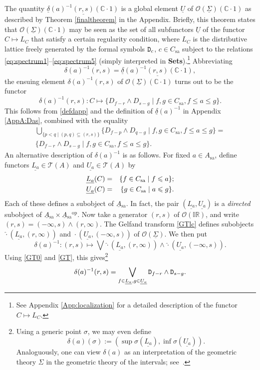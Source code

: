 \documentclass[12pt]{article}
\newcommand{\IR}{\mathbb{IR}}
\newcommand{\beq}{\begin{equation}}
\newcommand{\eeq}{\end{equation}}
\newcommand{\Sets}{\mbox{\textbf{Sets}}}
\newcommand{\inv}{^{-1}}
\newcommand{\er}{\eqref}
\newcommand{\dl}{\delta} \newcommand{\Dl}{\Delta}
\newcommand{\CO}{{\mathcal O}} \newcommand{\CP}{{\mathcal P}}
\newcommand{\C}{{\mathbb C}} \newcommand{\D}{{\mathbb D}}
\newcommand{\alg}[1]{\ensuremath{#1}}
\newcommand{\functor}[1]{\ensuremath{\underline{#1}}}
\newcommand{\op}{\ensuremath{^{\mathrm{op}}}}
\newcommand{\asstopos}{\ensuremath{\mathcal{T}}}
\newcommand{\sa}{\ensuremath{_{\mathrm{sa}}}}
\newcommand{\prop}[1]{\ensuremath{\mbox{\texttt{#1}}}}
\newcommand{\uA}{\underline{A}}
\newcommand{\TA}{\mathcal{T}(A)}
\newcommand{\ulS}{\functor{\Sigma}}
\renewcommand{\TA}{\asstopos(\alg{A})}
\begin{document}
The quantity $\underline{\dl}(a)\inv \underline{(r,s)}(\C\cdot 1)$
 is a global element $\underline{U}$ of $\CO(\ulS)(\C\cdot 1)$ as described by Theorem \ref{finaltheorem}
 in the Appendix. Briefly, this theorem states that $\CO(\ulS)(\C\cdot 1)$ may be seen as the set of all subfunctors $\underline{U}$ of the functor $C\mapsto L_C$ that satisfy a certain regularity condition,
 where $L_C$ is the  distributive lattice  freely generated by the formal symbols $\prop{D}_c$, $c\in C\sa$ subject to the relations \er{eq:spectrum1}--\er{eq:spectrum5} (simply interpreted in \Sets).\footnote{See Appendix \ref{App:localization}
 for a detailed description of the functor $C\mapsto L_C$.}
 Abbreviating
\beq
\dl(a)\inv(r,s)=\underline{\dl}(a)\inv \underline{(r,s)}(\C\cdot 1),
\eeq
 the ensuing element $\dl(a)\inv(r,s)$ of $\CO(\ulS)(\C\cdot 1)$ turns out to be the functor
\beq
\dl(a)\inv(r,s): C \mapsto \{{D}_{f-r} \wedge
 {D}_{s-g}\mid f,g\in C\sa, f \leqslant a \leqslant g\}.
\label{Da}
\eeq
This follows from \er{defdapp} and the definition of $\underline{\dl}(a)\inv$
 in Appendix \ref{AppA:Das}, combined with the equality
\begin{multline*}
   \bigcup_{\{p<q\mid (p,q)\subseteq (r,s)\}}  \{{D}_{f-p} \wedge
 {D}_{q-g}\mid f,g\in C\sa, f \leqslant a \leqslant g\}= \\ 
 \{{D}_{f-r} \wedge
 {D}_{s-g}\mid f,g\in C\sa, f \leqslant a \leqslant g\}.
\end{multline*}
An alternative description of $\dl(a)\inv$ is as follows.
For fixed $a\in A\sa$, define functors $\underline{L_a}\in\TA$ and
$\underline{U_a}\in\TA$ by
 \begin{eqnarray}
\underline{L_a}(C)&=& \{f\in C\sa\mid f\leqslant a\}; \nn\\
\underline{U_a}(C)&=& \{g\in C\sa\mid a\leqslant g\}.
\end{eqnarray}
Each of these defines a subobject of $\uA\sa$. In fact, the pair $(\underline{L_a},
\underline{U_a})$ is a
\emph{directed} subobject of $\uA\sa\times \uA\sa\op$.
Now take a  generator $(r,s)$ of $\CO(\IR)$, and write $(r,s)=(-\infty,s)\wedge (r,\infty)$.
The Gelfand transform \er{GTlc} defines subobjects $\hat{\cdot}(\underline{L_a},
(r,\infty))$
and $\hat{\cdot}(\underline{U_a}, (-\infty,s))$ of $\CO(\ulS)$. We then put
\beq
  \dl(a)\inv: (r,s)\mapsto \bigvee \hat{\cdot}(\underline{L_a}, (r,\infty))
\wedge \hat{\cdot}(\underline{U_a}, (-\infty,s)).
  \eeq
Using \er{GT0} and \er{GT}, this gives\footnote{Using
a generic point $\sigma$, we may even define\[\dl(a)(\sigma):=(\sup
\sigma(\underline{L_a}),\inf \sigma(\underline{U_a})).\] Analoguously, one can view $\dl(a)$ as an interpretation of
the geometric theory $\Sigma$ in the geometric theory of the intervals;
see~\cite{Coquand/Spitters:integrals-valuations}.}
\beq
  \dl(a)^{-1}(r,s)
  = \bigvee_{f \in \underline{L_a}, g \in \underline{U_a}} \prop{D}_{f-r} \wedge \prop{D}_{s-g}.
  \label{dasbasbis}
\eeq
\end{document}
